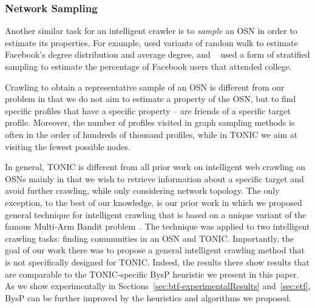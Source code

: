 \documentclass[journal]{IEEEtran}
\begin{document}
%


\subsubsection{Network Sampling}

Another similar task for an intelligent crawler is to {\em sample} an OSN in order to estimate its properties. 
For example,  used variants of random walk to estimate Facebook's degree distribution and average degree, and ~ used a form of stratified sampling to estimate the percentage of Facebook users that attended college. 

Crawling to obtain a representative sample of an OSN is different from our problem in that we do not aim to estimate a property of the OSN, but to find specific profiles that have a specific property -- are friends of a specific target profile. Moreover, the number of profiles visited in graph sampling methods is often in the order of hundreds of thousand profiles, while in  TONIC we aim at visiting the fewest possible nodes. 


In general, TONIC is different from all prior work on intelligent web crawling on OSNs mainly in that we wish to retrieve information about a specific target and avoid further crawling, while only considering network topology. The only exception, to the best of our knowledge, is our prior work in which we proposed general technique for intelligent crawling that is based on a unique variant of the famous Multi-Arm Bandit problem~\cite{bnaya2013social-journal}. The technique was applied to two intelligent crawling tasks: finding communities in an OSN and TONIC. Importantly, the goal of our work there was to propose a general intelligent crawling method that is not specifically designed for TONIC. Indeed, the results there show results that are comparable to the TONIC-specific BysP heuristic we present in this paper. As we show experimentally in Sections~\ref{sec:btf-experimentalResults} and~\ref{sec:etf}, BysP can be further improved by the heuristics and algorithms we proposed. 
\end{document}
